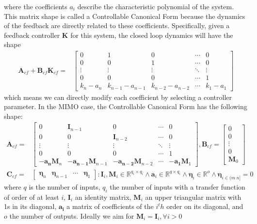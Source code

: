 \documentclass[runningheads,a4paper]{llncs}
\newcommand{\mat}[1]{\boldsymbol{#1}}
\begin{document}
where the coefficients $a_i$ describe the characteristic polynomial of the system. This matrix shape is
called a Controllable Canonical Form because the dynamics of the feedback are directly related to these
coefficients. Specifically, given a feedback controller $\mat{K}$ for this system, the closed loop dynamics
will have the shape
\begin{align}
\mat{A}_{cf}+\mat{B}_{cf}\mat{K}_{cf}=&\left[
\begin{array}{ccccc}
0&1&0&\cdots&0\\
0&0&1&\cdots&0\\
\vdots&\vdots&\vdots&\ddots&\vdots\\
0&0&0&\cdots&1\\
k_n-a_n&k_{n-1}-a_{n-1}&k_{n-2}-a_{n-2}&\cdots&k_1-a_1
\end{array}\right]
\label{eq:cf_SISO_fb}
\end{align}
which means we can directly modify each coefficient by selecting a controller parameter.
In the MIMO case, the Controllable Canonical Form has the following shape:
\begin{align}
\mat{A}_{cf}=&\left[
\begin{array}{ccccc}
0&\mat{I}_{n-1}&0&\cdots&0\\
0&0&\mat{I}_{n-2}&\cdots&0\\
\vdots&\vdots&\vdots&\ddots&\vdots\\
0&0&0&\cdots&1\\
-\mat{a_n}\mat{M}_n&-\mat{a_{n-1}}\mat{M}_{n-1}&-\mat{a_{n-2}}\mat{M}_{n-2}&\cdots&-\mat{a_1}\mat{M}_{1}
\end{array}\right],
\mat{B}_{cf}=\left[
\begin{array}{c}
0\\0\\ \vdots\\ 0\\ \mat{M}_0
\end{array}\right]\nonumber\\
\mat{C}_{cf}=&[\begin{array}{ccccc}\mat{\eta}_n&\mat{\eta}_{n-1}&\cdots&\mat{\eta}_1\end{array}] :
\mat{I}_i,\mat{M}_i \in \mathbb{R}^{q_i \times q_i} \wedge \mat{a}_i \in \mathbb{R}^{q \times q_i} \wedge \mat{\eta}_i \in \mathbb{R}^o \wedge  \mat{\eta}_{i \in (m\ n]}=0 \nonumber
\label{eq:cf_MIMO}
\end{align}
where $q$ is the number of inputs, $q_i$ the number of inputs with a transfer function of order of at least $i$, $\mat{I}_i$ an identity matrix, $\mat{M}_i$ an upper triangular matrix with 1s in its diagonal, $\mat{a_i}$ a matrix of coefficients of the $i^th$ order on its diagonal, and $o$ the number of outputs. Ideally we aim for $\mat{M}_i=\mat{I}_i, \forall i>0$
\end{document}
